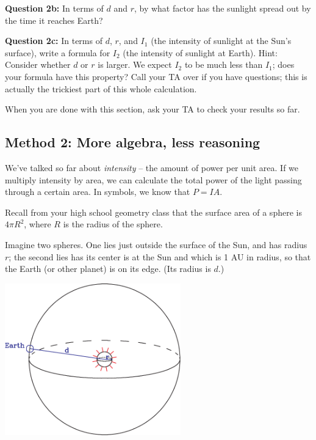 \documentclass[11pt]{article}
\begin{document}
{\bf Question 2b:} In terms of $d$ and $r$, by what factor has the sunlight spread out by the time it reaches Earth?

\vspace*{5cm}

\hrulefill
\newpage
{\bf Question 2c:} In terms of $d$, $r$, and $I_1$ (the intensity of sunlight at the Sun's surface), write a formula for $I_2$ (the intensity of sunlight at Earth). 
Hint: Consider whether $d$ or $r$ is larger.
We expect $I_2$ to be much less than $I_1$; does your formula have this property? Call your TA over if you have questions; this is actually the trickiest part of this whole calculation.

\vspace*{5cm}

\hrulefill

When you are done with this section, ask your TA to check your results so far.

\subsection*{Method 2: More algebra, less reasoning}

We've talked so far about {\it intensity} -- the amount of power per unit area. If we multiply intensity by area, we can 
calculate the total power of the light passing through a certain area. In symbols, we know that $P=IA$.

Recall from your high school geometry class that the surface area of a sphere is $4\pi R^2$, where $R$ is the radius of 
the sphere.

Imagine two spheres. One lies just outside the surface of the Sun, and has radius $r$; the second lies
has its center is at the Sun and which is 1 AU in radius, so that the Earth (or other planet) 
is on its edge. (Its radius is $d$.) 

\begin{center}
\includegraphics[width=3in]{expand-crop.pdf}
\end{center}
\end{document}

